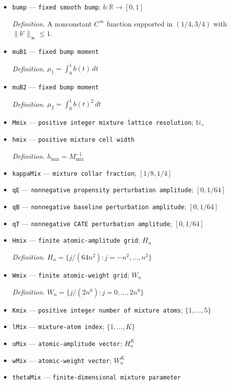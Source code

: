 \documentclass{article}
\begin{document}
\begin{itemize}
  \item \texttt{bump} --- \texttt{fixed smooth bump}; \(b:\mathbb R\to[0,1]\)
  \par\smallskip\noindent\emph{Definition.} A nonconstant \(C^\infty\) function supported in \((1/4,3/4)\) with \(\|b'\|_\infty\le1\).
  \item \texttt{muB1} --- \texttt{fixed bump moment}
  \par\smallskip\noindent\emph{Definition.} \(\mu_1=\int_0^1 b(t)\,dt\)
  \item \texttt{muB2} --- \texttt{fixed bump moment}
  \par\smallskip\noindent\emph{Definition.} \(\mu_2=\int_0^1 b(t)^2\,dt\)
  \item \texttt{Mmix} --- \texttt{positive integer mixture lattice resolution}; \(\mathbb N_{+}\)
  \item \texttt{hmix} --- \texttt{positive mixture cell width}
  \par\smallskip\noindent\emph{Definition.} \(h_{\mathrm{mix}}=M_{\mathrm{mix}}^{-1}\)
  \item \texttt{kappaMix} --- \texttt{mixture collar fraction}; \([1/8,1/4]\)
  \item \texttt{qE} --- \texttt{nonnegative propensity perturbation amplitude}; \([0,1/64]\)
  \item \texttt{qB} --- \texttt{nonnegative baseline perturbation amplitude}; \([0,1/64]\)
  \item \texttt{qT} --- \texttt{nonnegative CATE perturbation amplitude}; \([0,1/64]\)
  \item \texttt{Hmix} --- \texttt{finite atomic-\allowbreak{}amplitude grid}; \(H_n\)
  \par\smallskip\noindent\emph{Definition.} \(H_n=\{j/(64n^2):j=-n^2,\ldots,n^2\}\)
  \item \texttt{Wmix} --- \texttt{finite atomic-\allowbreak{}weight grid}; \(W_n\)
  \par\smallskip\noindent\emph{Definition.} \(W_n=\{j/(2n^8):j=0,\ldots,2n^8\}\)
  \item \texttt{Kmix} --- \texttt{positive integer number of mixture atoms}; \(\{1,\ldots,5\}\)
  \item \texttt{lMix} --- \texttt{mixture-\allowbreak{}atom index}; \(\{1,\ldots,K\}\)
  \item \texttt{uMix} --- \texttt{atomic-\allowbreak{}amplitude vector}; \(H_n^K\)
  \item \texttt{wMix} --- \texttt{atomic-\allowbreak{}weight vector}; \(W_n^K\)
  \item \texttt{thetaMix} --- \texttt{finite-\allowbreak{}dimensional mixture parameter}

\end{itemize}
\end{document}
